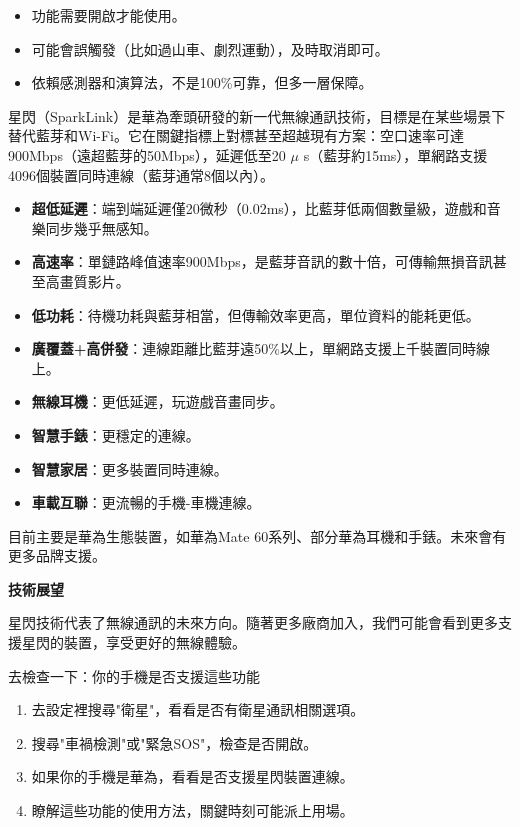 \begin{itemize}
  \item 功能需要開啟才能使用。
  \item 可能會誤觸發（比如過山車、劇烈運動），及時取消即可。
  \item 依賴感測器和演算法，不是100\%可靠，但多一層保障。
\end{itemize}


星閃（SparkLink）是華為牽頭研發的新一代無線通訊技術，目標是在某些場景下替代藍芽和Wi-Fi。它在關鍵指標上對標甚至超越現有方案：空口速率可達900Mbps（遠超藍芽的50Mbps），延遲低至20 $\mu$ s（藍芽約15ms），單網路支援4096個裝置同時連線（藍芽通常8個以內）。


\begin{itemize}
  \item \textbf{超低延遲}：端到端延遲僅20微秒（0.02ms），比藍芽低兩個數量級，遊戲和音樂同步幾乎無感知。
  \item \textbf{高速率}：單鏈路峰值速率900Mbps，是藍芽音訊的數十倍，可傳輸無損音訊甚至高畫質影片。
  \item \textbf{低功耗}：待機功耗與藍芽相當，但傳輸效率更高，單位資料的能耗更低。
  \item \textbf{廣覆蓋+高併發}：連線距離比藍芽遠50\%以上，單網路支援上千裝置同時線上。
\end{itemize}


\begin{itemize}
  \item \textbf{無線耳機}：更低延遲，玩遊戲音畫同步。
  \item \textbf{智慧手錶}：更穩定的連線。
  \item \textbf{智慧家居}：更多裝置同時連線。
  \item \textbf{車載互聯}：更流暢的手機-車機連線。
\end{itemize}


目前主要是華為生態裝置，如華為Mate 60系列、部分華為耳機和手錶。未來會有更多品牌支援。

\textbf{技術展望}\par

星閃技術代表了無線通訊的未來方向。隨著更多廠商加入，我們可能會看到更多支援星閃的裝置，享受更好的無線體驗。

\begin{tcbpractice}{去檢查一下：你的手機是否支援這些功能}
\begin{enumerate}
  \item 去設定裡搜尋"衛星"，看看是否有衛星通訊相關選項。
  \item 搜尋"車禍檢測"或"緊急SOS"，檢查是否開啟。
  \item 如果你的手機是華為，看看是否支援星閃裝置連線。
  \item 瞭解這些功能的使用方法，關鍵時刻可能派上用場。
\end{enumerate}

\end{tcbpractice}
